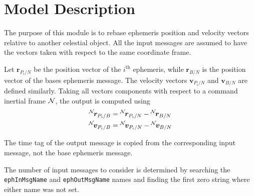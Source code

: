 


\section{Model Description}
The purpose of this module is to rebase ephemeris position and velocity vectors relative to another celestial object.  All the input messages are assumed to have the vectors taken with respect to the same coordinate frame.

Let $\bm r_{P_{i}/N}$ be the position vector of the $i^{\text{th}}$ ephemeris, while $\bm r_{B/N}$ is the position vector of the bases ephemeris message.  The velocity vectors $\bm v_{P_{i}/N}$ and $\bm v_{B/N}$ are defined similarly.  Taking all vectors components with respect to a command inertial frame $\cal N$, the output is computed using
\begin{align}
	\leftexp{N}{\bm r}_{P_{i}/B} &= \leftexp{N}{\bm r}_{P_{i}/N} - \leftexp{N}{\bm r}_{B/N}
	\\
	\leftexp{N}{\bm v}_{P_{i}/B} &= \leftexp{N}{\bm v}_{P_{i}/N} - \leftexp{N}{\bm v}_{B/N}
\end{align}

The time tag of the output message is copied from the corresponding input message, not the base ephemeris message.

The number of input messages to consider is determined by searching the {\tt ephInMsgName} and {\tt ephOutMsgName} names and finding the first zero string where either name was not set.  

